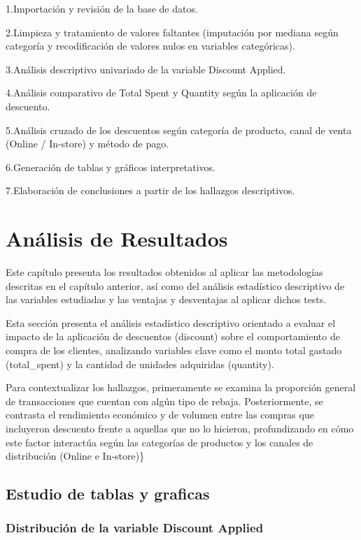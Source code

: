 \documentclass[oneside,11pt]{Latex/Classes/PhDthesisPSnPDF}
\begin{document}
1.Importación y revisión de la base de datos.

2.Limpieza y tratamiento de valores faltantes (imputación por mediana
según categoría y recodificación de valores nulos en variables
categóricas).

3.Análisis descriptivo univariado de la variable Discount Applied.

4.Análisis comparativo de Total Spent y Quantity según la aplicación de
descuento.

5.Análisis cruzado de los descuentos según categoría de producto, canal
de venta (Online / In-store) y método de pago.

6.Generación de tablas y gráficos interpretativos.

7.Elaboración de conclusiones a partir de los hallazgos descriptivos.\\

\chapter{Análisis de Resultados}

\small Este capítulo presenta los resultados obtenidos al aplicar las
metodologías descritas en el capítulo anterior, así como del análisis
estadístico descriptivo de las variables estudiadas y las ventajas y
desventajas al aplicar dichos tests.

Esta sección presenta el análisis estadístico descriptivo orientado a
evaluar el impacto de la aplicación de descuentos (discount) sobre el
comportamiento de compra de los clientes, analizando variables clave
como el monto total gastado (total\_spent) y la cantidad de unidades
adquiridas (quantity).

Para contextualizar los hallazgos, primeramente se examina la proporción
general de transacciones que cuentan con algún tipo de rebaja.
Posteriormente, se contrasta el rendimiento económico y de volumen entre
las compras que incluyeron descuento frente a aquellas que no lo
hicieron, profundizando en cómo este factor interactúa según las
categorías de productos y los canales de distribución (Online e
In-store)\}

\section{Estudio de tablas y graficas}

\subsection{ Distribución de la variable Discount Applied}
\end{document}

